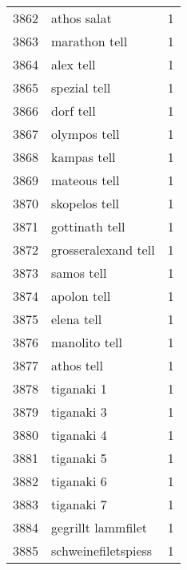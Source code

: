 \begin{tabular}{llr}
3862 &                                        athos salat &      1 \\
3863 &                                      marathon tell &      1 \\
3864 &                                          alex tell &      1 \\
3865 &                                       spezial tell &      1 \\
3866 &                                          dorf tell &      1 \\
3867 &                                       olympos tell &      1 \\
3868 &                                        kampas tell &      1 \\
3869 &                                       mateous tell &      1 \\
3870 &                                      skopelos tell &      1 \\
3871 &                                     gottinath tell &      1 \\
3872 &                                grosseralexand tell &      1 \\
3873 &                                         samos tell &      1 \\
3874 &                                        apolon tell &      1 \\
3875 &                                         elena tell &      1 \\
3876 &                                      manolito tell &      1 \\
3877 &                                         athos tell &      1 \\
3878 &                                         tiganaki 1 &      1 \\
3879 &                                         tiganaki 3 &      1 \\
3880 &                                         tiganaki 4 &      1 \\
3881 &                                         tiganaki 5 &      1 \\
3882 &                                         tiganaki 6 &      1 \\
3883 &                                         tiganaki 7 &      1 \\
3884 &                                 gegrillt lammfilet &      1 \\
3885 &                                schweinefiletspiess &      1 \\

\end{tabular}
